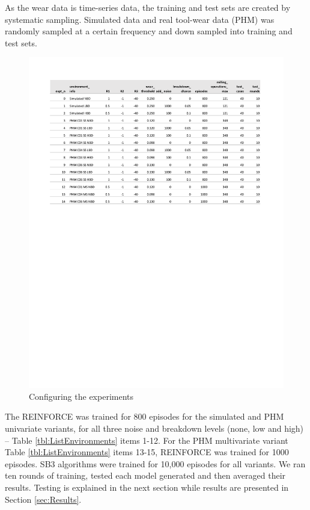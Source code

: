 \documentclass[a4paper, 12pt]{article}
\begin{document}
As the wear data is time-series data, the training and test sets are created by systematic sampling. Simulated data and real tool-wear data (PHM) was randomly sampled at a certain frequency and down sampled into training and test sets.

\begin{figure}[ht]
	\centering	
	\includegraphics[width=\textwidth, trim={1.5cm 15cm 1cm 2cm}, clip]{images/TrainingPlots/Experiments_Sheet_select.pdf}  
	\caption{Configuring the experiments}
	\label{fig:exptconfig}
\end{figure}

The REINFORCE was trained for 800 episodes for the simulated and PHM univariate variants, for all three noise and breakdown levels (none, low and high) -- Table \ref{tbl:ListEnvironments} items 1-12. For the PHM multivariate variant Table \ref{tbl:ListEnvironments} items 13-15, REINFORCE was trained for 1000 episodes. SB3 algorithms were trained for 10,000 episodes for all variants. We ran ten rounds of training, tested each model generated and then averaged their results. Testing is explained in the next section while results are presented in Section \ref{sec:Results}.
\end{document}
